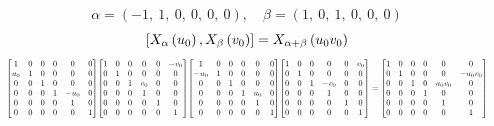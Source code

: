 \documentclass[11pt]{article}
\theoremstyle{definition}
\begin{document}
\[
\alpha = \left( -1, \  1, \  0, \  0, \  0, \  0\right), \quad \beta = \left( 1, \  0, \  1, \  0, \  0, \  0\right)
\]
\[
\scaletoalign{\textwidth}{\left[ X_{\alpha}\left(u_{0}\right), X_{\beta}\left(v_{0}\right) \right] = X_{\alpha + \beta}\left(u_{0} v_{0}\right)}
\]
\[
\scaletoalign{\textwidth}{{\left[\begin{matrix}1 & 0 & 0 & 0 & 0 & 0\\u_{0} & 1 & 0 & 0 & 0 & 0\\0 & 0 & 1 & 0 & 0 & 0\\0 & 0 & 0 & 1 & - u_{0} & 0\\0 & 0 & 0 & 0 & 1 & 0\\0 & 0 & 0 & 0 & 0 & 1\end{matrix}\right]} {\left[\begin{matrix}1 & 0 & 0 & 0 & 0 & - v_{0}\\0 & 1 & 0 & 0 & 0 & 0\\0 & 0 & 1 & v_{0} & 0 & 0\\0 & 0 & 0 & 1 & 0 & 0\\0 & 0 & 0 & 0 & 1 & 0\\0 & 0 & 0 & 0 & 0 & 1\end{matrix}\right]} {\left[\begin{matrix}1 & 0 & 0 & 0 & 0 & 0\\- u_{0} & 1 & 0 & 0 & 0 & 0\\0 & 0 & 1 & 0 & 0 & 0\\0 & 0 & 0 & 1 & u_{0} & 0\\0 & 0 & 0 & 0 & 1 & 0\\0 & 0 & 0 & 0 & 0 & 1\end{matrix}\right]} {\left[\begin{matrix}1 & 0 & 0 & 0 & 0 & v_{0}\\0 & 1 & 0 & 0 & 0 & 0\\0 & 0 & 1 & - v_{0} & 0 & 0\\0 & 0 & 0 & 1 & 0 & 0\\0 & 0 & 0 & 0 & 1 & 0\\0 & 0 & 0 & 0 & 0 & 1\end{matrix}\right]} = {\left[\begin{matrix}1 & 0 & 0 & 0 & 0 & 0\\0 & 1 & 0 & 0 & 0 & - u_{0} v_{0}\\0 & 0 & 1 & 0 & u_{0} v_{0} & 0\\0 & 0 & 0 & 1 & 0 & 0\\0 & 0 & 0 & 0 & 1 & 0\\0 & 0 & 0 & 0 & 0 & 1\end{matrix}\right]}}
\]
\end{document}
